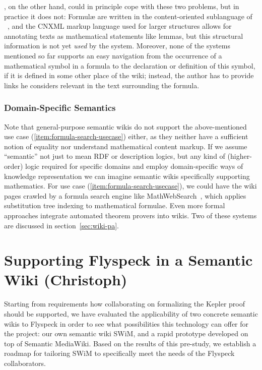 \documentclass{llncs}
\begin{document}
, on the other hand, could in principle cope with these two problems,
but in practice it does not: Formulæ are written in the content-oriented sublanguage of
{\mathml}~\cite{CarlisleEd:MathML07}, and the CNXML markup language used for larger
structures allows for annotating texts as mathematical statements like lemmas, but this
structural information is not yet \emph{used} by the system.  Moreover, none of the
systems mentioned so far supports an easy navigation from the occurrence of a mathematical
symbol in a formula to the declaration or definition of this symbol, if it is defined in
some other place of the wiki; instead, the author has to provide links he considers
relevant in the text surrounding the formula.

\subsubsection{Domain-Specific Semantics}
\label{sec:domain-semantics}

Note that general-purpose semantic wikis do not support the above-mentioned use case
(\ref{item:formula-search-usecase}) either, as they neither have a sufficient notion of
equality nor understand mathematical content markup.  If we assume ``semantic'' not just
to mean RDF or description logics, but any kind of (higher-order) logic required for
specific domains and employ domain-specific ways of knowledge representation we can
imagine semantic wikis specifically supporting mathematics.  For use case
(\ref{item:formula-search-usecase}), we could have the wiki pages crawled by a formula
search engine like MathWebSearch~\cite{KohSuc:asemf06}, which applies substitution tree
indexing to mathematical formulae.  Even more formal approaches integrate automated
theorem provers into wikis.  Two of these systems are discussed in
section~\ref{sec:wiki-pa}.

\section{Supporting Flyspeck in a Semantic Wiki (Christoph)}

Starting from requirements how collaborating on formalizing the Kepler proof should be
supported, we have evaluated the applicability of two concrete semantic wikis to Flyspeck
in order to see what possibilities this technology can offer for the project:  our own
semantic wiki SWiM, and a rapid prototype developed on top of Semantic MediaWiki.  Based on the
results of this pre-study, we establish a roadmap for tailoring SWiM to specifically meet
the needs of the Flyspeck collaborators.
\end{document}
